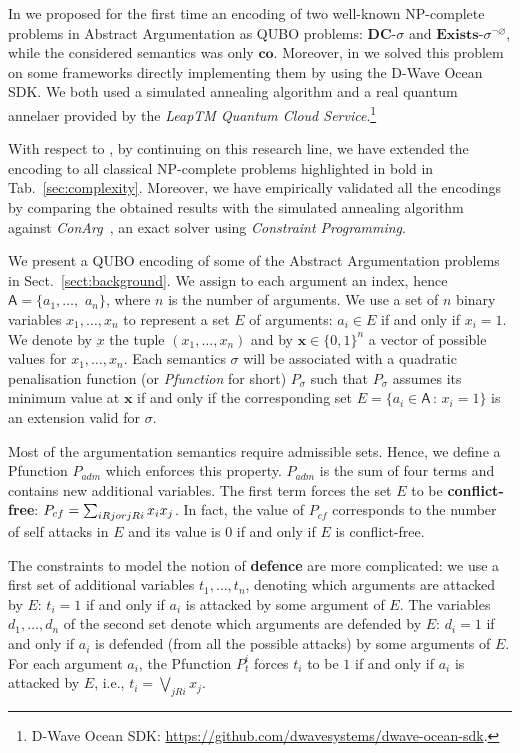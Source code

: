 \documentclass[conference]{IEEEtran}
\newcommand{\args}{\ensuremath{\mathsf{A}}\xspace} %
\newcommand{\atts}{\ensuremath{R}\xspace}
\newcommand{\co}{\mathbf{co}}
\newcommand{\dc}{\mathbf{DC}}
\begin{document}
In \cite{pricai22} we proposed for the first time an encoding of two well-known NP-complete problems in Abstract Argumentation as QUBO problems:   
$\dc\textit{-}\sigma$ and
$\mathit{\textbf{Exists}}\textit{-}\sigma^{\neg\varnothing}$, 
while the considered semantics was only $\co$.  
Moreover, in \cite{pricai22} we solved this problem on some frameworks directly  implementing them by using the D-Wave Ocean SDK. We both used a simulated annealing algorithm and a real quantum annelaer provided by the \emph{LeapTM Quantum Cloud Service}.\footnote{D-Wave Ocean SDK: \url{https://github.com/dwavesystems/dwave-ocean-sdk}.}

With respect to \cite{pricai22}, by continuing on this research line, we have extended the encoding to all classical NP-complete problems highlighted in bold in Tab.~\ref{sec:complexity}.
Moreover, we have empirically validated all the encodings by comparing the obtained results with the simulated annealing algorithm against \emph{ConArg}~\cite{conarg}, an exact solver using \emph{Constraint Programming}.



We  present a QUBO encoding of some of the Abstract Argumentation problems  in Sect.~\ref{sect:background}. 
We assign to each argument an index, hence $\args=\{a_1,\dots,$ $a_n\}$, where $n$ is the number of arguments. We use
a set of $n$ binary variables $x_1,\dots,x_n$ to represent a set $E$ of arguments: 
$a_i\in E$ if and only if $x_i=1$. We denote by $\underbar{x}$ the tuple $(x_1,\dots,x_n)$
and by $\mathbf{x}\in\{0,1\}^n$ a vector of possible values for $x_1,\dots,x_n$.
Each semantics $\sigma$ will be associated with a quadratic penalisation function (or \emph{Pfunction} for short) $P_{\sigma}$ such that $P_{\sigma}$ assumes its minimum value at $\mathbf{x}$ if and only if the corresponding set $E=\{a_i\in \args \,:\, x_i=1\}$ is an extension valid for $\sigma$. 

Most of the argumentation semantics require admissible sets. Hence, we define a Pfunction $P_{adm}$ which enforces this property. $P_{adm}$ is the sum of four terms and contains new additional variables.
The first term forces the set $E$ to be \textbf{conflict-free}:
$ P_{cf}=\sum_{i \atts j \mbox{ or }\\
	j \atts i} x_i x_j $. In fact, the value of $ P_{cf}$ corresponds to the number of self attacks in $E$
and its value is $0$ if and only if $E$ is conflict-free. 

The constraints to model the notion of \textbf{defence} are more complicated: we use a first set of additional variables $t_1,\dots,t_n$, denoting which arguments are attacked by $E$: $t_i=1$ if and only if $a_i$ is attacked by some argument of $E$. 
The variables $d_1,\dots,d_n$ of the second set denote which arguments are defended by $E$: $d_i=1$ if and only if $a_i$ is defended (from all the possible attacks) by some arguments of $E$. For each argument $a_i$, the Pfunction $P_{t}^i$ forces $t_i$ to be $1$ if and only if $a_i$ is attacked by $E$, i.e.,
$t_i = \bigvee_{j \atts i} x_j$.
\end{document}
